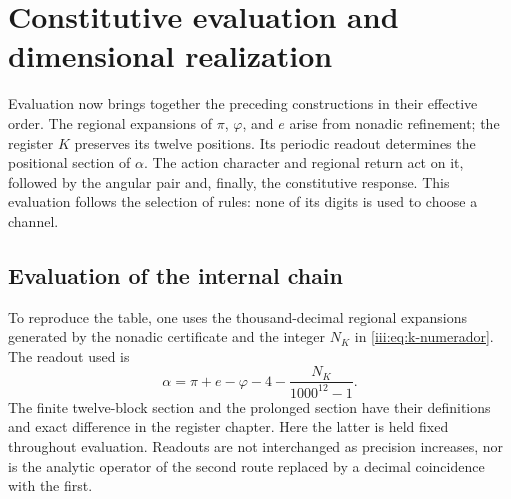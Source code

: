 \section{Constitutive evaluation and dimensional realization}
\label{iii:iii:sec:evaluacion}

Evaluation now brings together the preceding constructions in their effective order.
The regional expansions of $\pi$, $\varphi$, and $e$ arise from nonadic
refinement; the register $K$ preserves its twelve positions. Its periodic readout
determines the positional section of $\alpha$. The action character
and regional return act on it, followed by the angular pair and, finally, the
constitutive response. This evaluation follows the selection of
rules: none of its digits is used to choose a channel.

\subsection{Evaluation of the internal chain}

To reproduce the table, one uses the thousand-decimal regional expansions
generated by the nonadic certificate and the integer $N_K$ in
\eqref{iii:eq:k-numerador}. The readout used is
\[
 \alpha=\pi+e-\varphi-4-\frac{N_K}{1000^{12}-1}.
\]
The finite twelve-block section and the prolonged section have their
definitions and exact difference in the register chapter. Here the
latter is held fixed throughout evaluation. Readouts are not interchanged
as precision increases, nor is the analytic operator
of the second route replaced by a decimal coincidence with the first.


